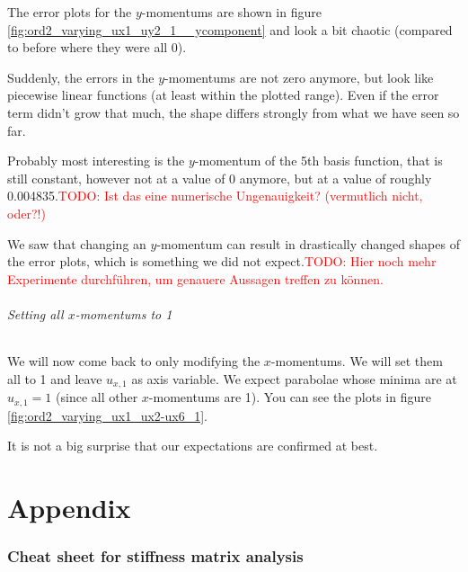 \documentclass{article}
\newcommand{\todo}[1]{\textcolor{red}{TODO: #1}}
\begin{document}
The error plots for the $y$-momentums are shown in figure \ref{fig:ord2_varying_ux1_uy2_1__ycomponent} and look a bit chaotic (compared to before where they were all 0).



Suddenly, the errors in the $y$-momentums are not zero anymore, but look like piecewise linear functions (at least within the plotted range). Even if the error term didn't grow that much, the shape differs strongly from what we have seen so far.

Probably most interesting is the $y$-momentum of the 5th basis function, that is still constant, however not at a value of 0 anymore, but at a value of roughly 0.004835.\todo{Ist das eine numerische Ungenauigkeit? (vermutlich nicht, oder?!)}

We saw that changing an $y$-momentum can result in drastically changed shapes of the error plots,  which is something we did not expect.\todo{Hier noch mehr Experimente durchführen, um genauere Aussagen treffen zu können.}

\paragraph{Setting all $x$-momentums to 1}

We will now come back to only modifying the $x$-momentums. We will set them all to 1 and leave $u_{x,1}$ as axis variable. We expect parabolae whose minima are at $u_{x,1}=1$ (since all other $x$-momentums are 1). You can see the plots in figure \ref{fig:ord2_varying_ux1_ux2-ux6_1}.



It is not a big surprise that our expectations are confirmed at best.

\cleardoublepage{}



\appendix

\clearpage{}
\part{Appendix}
\label{part:cheat-sheet}

\section{Cheat sheet for stiffness matrix analysis}
\end{document}
